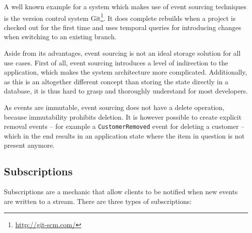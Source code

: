 A well known example for a system which makes use of event sourcing techniques is the version control system Git\footnote{\url{http://git-scm.com/}}.
It does complete rebuilds when a project is checked out for the first time and uses temporal queries for introducing changes when switching to an existing branch. 

Aside from its advantages, event sourcing is not an ideal storage solution for all use cases.
First of all, event sourcing introduces a level of indirection to the application, which makes the system architecture more complicated.
Additionally, as this is an altogether different concept than storing the state directly in a database, it is thus hard to grasp and thoroughly understand for most developers.


As events are immutable, event sourcing does not have a delete operation, because immutability prohibits deletion.
It is however possible to create explicit removal events -- for example a \texttt{CustomerRemoved} event for deleting a customer -- which in the end results in an application state where the item in question is not present anymore.

\cite{WEB:Fowler:2011}


\subsection{Subscriptions}

Subscriptions are a mechanic that allow clients to be notified when new events are written to a stream.
There are three types of subscriptions:

